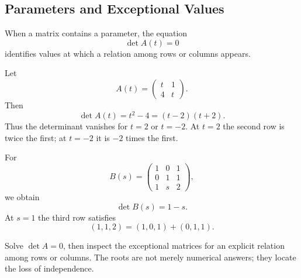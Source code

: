 \subsection{Parameters and Exceptional Values}

When a matrix contains a parameter, the equation
\[
\det A(t)=0
\]
identifies values at which a relation among rows or columns appears.

\begin{examplebox}
Let
\[
A(t)=\begin{pmatrix}t&1\\4&t\end{pmatrix}.
\]
Then
\[
\det A(t)=t^2-4=(t-2)(t+2).
\]
Thus the determinant vanishes for $t=2$ or $t=-2$. At $t=2$ the second row is twice the first; at $t=-2$ it is $-2$ times the first.
\end{examplebox}

\begin{examplebox}
For
\[
B(s)=\begin{pmatrix}
1&0&1\\0&1&1\\1&s&2
\end{pmatrix},
\]
we obtain
\[
\det B(s)=1-s.
\]
At $s=1$ the third row satisfies
\[
(1,1,2)=(1,0,1)+(0,1,1).
\]
\end{examplebox}

\begin{summarybox}
Solve $\det A=0$, then inspect the exceptional matrices for an explicit relation among rows or columns. The roots are not merely numerical answers; they locate the loss of independence.
\end{summarybox}
